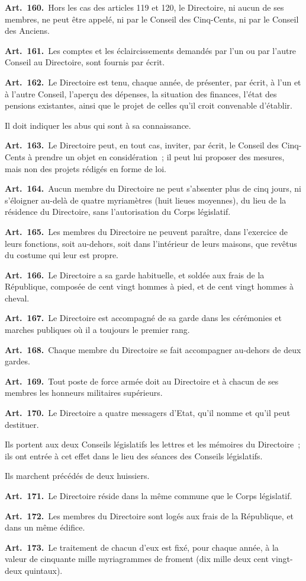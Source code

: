 \documentclass[french,twoside]{book} %
\newcommand{\labelchar}[1]{\textbf{\color{rubric} #1}}
\begin{document}
\labelchar{Art. 160.} Hors les cas des articles 119 et 120, le Directoire, ni aucun de ses membres, ne peut être appelé, ni par le Conseil des Cinq-Cents, ni par le Conseil des Anciens.\par
\labelchar{Art. 161.} Les comptes et les éclaircissements demandés par l’un ou par l’autre Conseil au Directoire, sont fournis par écrit.\par
\labelchar{Art. 162.} Le Directoire est tenu, chaque année, de présenter, par écrit, à l’un et à l’autre Conseil, l’aperçu des dépenses, la situation des finances, l’état des pensions existantes, ainsi que le projet de celles qu’il croit convenable d’établir.\par
Il doit indiquer les abus qui sont à sa connaissance.\par
\labelchar{Art. 163.} Le Directoire peut, en tout cas, inviter, par écrit, le Conseil des Cinq-Cents à prendre un objet en considération ; il peut lui proposer des mesures, mais non des projets rédigés en forme de loi.\par
\labelchar{Art. 164.} Aucun membre du Directoire ne peut s’absenter plus de cinq jours, ni s’éloigner au-delà de quatre myriamètres (huit lieues moyennes), du lieu de la résidence du Directoire, sans l’autorisation du Corps législatif.\par
\labelchar{Art. 165.} Les membres du Directoire ne peuvent paraître, dans l’exercice de leurs fonctions, soit au-dehors, soit dans l’intérieur de leurs maisons, que revêtus du costume qui leur est propre.\par
\labelchar{Art. 166.} Le Directoire a sa garde habituelle, et soldée aux frais de la République, composée de cent vingt hommes à pied, et de cent vingt hommes à cheval.\par
\labelchar{Art. 167.} Le Directoire est accompagné de sa garde dans les cérémonies et marches publiques où il a toujours le premier rang.\par
\labelchar{Art. 168.} Chaque membre du Directoire se fait accompagner au-dehors de deux gardes.\par
\labelchar{Art. 169.} Tout poste de force armée doit au Directoire et à chacun de ses membres les honneurs militaires supérieurs.\par
\labelchar{Art. 170.} Le Directoire a quatre messagers d’Etat, qu’il nomme et qu’il peut destituer.\par
Ils portent aux deux Conseils législatifs les lettres et les mémoires du Directoire ; ils ont entrée à cet effet dans le lieu des séances des Conseils législatifs.\par
Ils marchent précédés de deux huissiers.\par
\labelchar{Art. 171.} Le Directoire réside dans la même commune que le Corps législatif.\par
\labelchar{Art. 172.} Les membres du Directoire sont logés aux frais de la République, et dans un même édifice.\par
\labelchar{Art. 173.} Le traitement de chacun d’eux est fixé, pour chaque année, à la valeur de cinquante mille myriagrammes de froment (dix mille deux cent vingt-deux quintaux).
\end{document}
